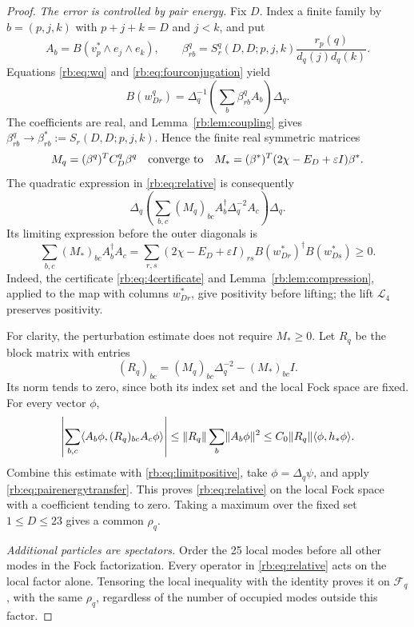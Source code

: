 \begin{proof}
\emph{The error is controlled by pair energy.}
Fix $D$.  Index a finite family by
$b=(p,j,k)$ with $p+j+k=D$ and $j<k$, and put
\[
 A_b=B(v_p^*\wedge e_j\wedge e_k),\qquad
 \beta_{rb}^q=S_r^q(D,D;p,j,k)
                \frac{r_p(q)}{d_q(j)d_q(k)}.
\]
Equations \eqref{rb:eq:wq} and \eqref{rb:eq:fourconjugation} yield
\[
 B(w_{Dr}^q)=\Delta_q^{-1}
             \left(\sum_b\beta_{rb}^qA_b\right)\Delta_q.
\]
The coefficients are real, and Lemma~\ref{rb:lem:coupling} gives
$\beta_{rb}^q\to\beta_{rb}^*:=S_r(D,D;p,j,k)$.  Hence the finite
real symmetric matrices
\[
 M_q=(\beta^q)^TC_D^q\beta^q
 \quad\hbox{converge to}\quad
 M_*=(\beta^*)^T(2\chi-E_D+\varepsilon I)\beta^*.
\]
The quadratic expression in \eqref{rb:eq:relative} is consequently
\[
 \Delta_q\left(\sum_{b,c}(M_q)_{bc}
                 A_b^\dagger\Delta_q^{-2}A_c\right)\Delta_q.
\]
Its limiting expression before the outer diagonals is
\begin{equation}\label{rb:eq:limitpositive}
 \sum_{b,c}(M_*)_{bc}A_b^\dagger A_c
 =\sum_{r,s}(2\chi-E_D+\varepsilon I)_{rs}
       B(w_{Dr}^*)^\dagger B(w_{Ds}^*)\ge0.
\end{equation}
Indeed, the certificate \eqref{rb:eq:4certificate} and
Lemma~\ref{rb:lem:compression}, applied to the map with columns $w_{Dr}^*$,
give positivity before lifting; the lift $\mathcal L_4$ preserves positivity.

For clarity, the perturbation estimate does not require $M_*\ge0$.
Let $R_q$ be the block matrix with entries
\[
 (R_q)_{bc}=(M_q)_{bc}\Delta_q^{-2}-(M_*)_{bc}I.
\]
Its norm tends to zero, since both its index set and the local Fock space
are fixed.  For every vector $\phi$,
\[
 \left|\sum_{b,c}\langle A_b\phi,(R_q)_{bc}A_c\phi\rangle\right|
 \le\lVert R_q\rVert\sum_b\lVert A_b\phi\rVert^2
 \le C_0\lVert R_q\rVert\langle \phi,h_*\phi\rangle.
\]
Combine this estimate with \eqref{rb:eq:limitpositive}, take
$\phi=\Delta_q\psi$, and apply \eqref{rb:eq:pairenergytransfer}.  This
proves \eqref{rb:eq:relative} on the local Fock space with a coefficient
tending to zero.  Taking a maximum over the fixed set $1\le D\le23$
gives a common $\rho_q$.

\emph{Additional particles are spectators.}
Order the 25 local modes before all other modes in the Fock
factorization.  Every operator in \eqref{rb:eq:relative} acts on the local
factor alone.  Tensoring the local inequality with the identity proves
it on $\mathcal F_q$, with the same $\rho_q$, regardless of the number of
occupied modes outside this factor.
\end{proof}

